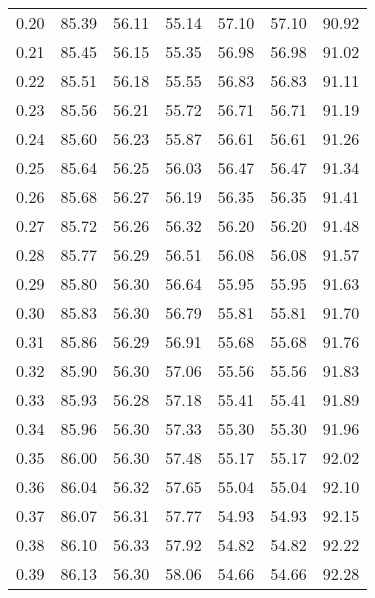\begin{tabular}{|c|c|c|c|c|c|c|}
      0.20 &     85.39 &     56.11 &      55.14 &   57.10 &      57.10 &         90.92 \\
      0.21 &     85.45 &     56.15 &      55.35 &   56.98 &      56.98 &         91.02 \\
      0.22 &     85.51 &     56.18 &      55.55 &   56.83 &      56.83 &         91.11 \\
      0.23 &     85.56 &     56.21 &      55.72 &   56.71 &      56.71 &         91.19 \\
      0.24 &     85.60 &     56.23 &      55.87 &   56.61 &      56.61 &         91.26 \\
      0.25 &     85.64 &     56.25 &      56.03 &   56.47 &      56.47 &         91.34 \\
      0.26 &     85.68 &     56.27 &      56.19 &   56.35 &      56.35 &         91.41 \\
      0.27 &     85.72 &     56.26 &      56.32 &   56.20 &      56.20 &         91.48 \\
      0.28 &     85.77 &     56.29 &      56.51 &   56.08 &      56.08 &         91.57 \\
      0.29 &     85.80 &     56.30 &      56.64 &   55.95 &      55.95 &         91.63 \\
      0.30 &     85.83 &     56.30 &      56.79 &   55.81 &      55.81 &         91.70 \\
      0.31 &     85.86 &     56.29 &      56.91 &   55.68 &      55.68 &         91.76 \\
      0.32 &     85.90 &     56.30 &      57.06 &   55.56 &      55.56 &         91.83 \\
      0.33 &     85.93 &     56.28 &      57.18 &   55.41 &      55.41 &         91.89 \\
      0.34 &     85.96 &     56.30 &      57.33 &   55.30 &      55.30 &         91.96 \\
      0.35 &     86.00 &     56.30 &      57.48 &   55.17 &      55.17 &         92.02 \\
      0.36 &     86.04 &     56.32 &      57.65 &   55.04 &      55.04 &         92.10 \\
      0.37 &     86.07 &     56.31 &      57.77 &   54.93 &      54.93 &         92.15 \\
      0.38 &     86.10 &     56.33 &      57.92 &   54.82 &      54.82 &         92.22 \\
      0.39 &     86.13 &     56.30 &      58.06 &   54.66 &      54.66 &         92.28 \\

\end{tabular}
